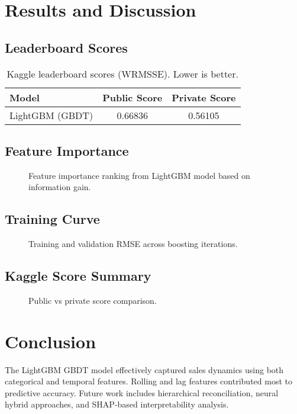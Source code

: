 \documentclass[12pt,a4paper]{article}
\begin{document}
\section{Results and Discussion}
\subsection{Leaderboard Scores}
\begin{table}[ht]
\centering
\caption{Kaggle leaderboard scores (WRMSSE). Lower is better.}
\begin{tabular}{lcc}
\toprule
Model & Public Score & Private Score \\
\midrule
LightGBM (GBDT) & 0.66836 & 0.56105 \\
\bottomrule
\end{tabular}
\end{table}

\subsection{Feature Importance}
\begin{figure}[ht]
\centering
{}
\caption{Feature importance ranking from LightGBM model based on information gain.}
\end{figure}

\subsection{Training Curve}
\begin{figure}[ht]
\centering
{}
\caption{Training and validation RMSE across boosting iterations.}
\end{figure}

\subsection{Kaggle Score Summary}
\begin{figure}[ht]
\centering
{}
\caption{Public vs private score comparison.}
\end{figure}

\section{Conclusion}
The LightGBM GBDT model effectively captured sales dynamics using both categorical and temporal features.
Rolling and lag features contributed most to predictive accuracy. 
Future work includes hierarchical reconciliation, neural hybrid approaches, and SHAP-based interpretability analysis.
\end{document}
